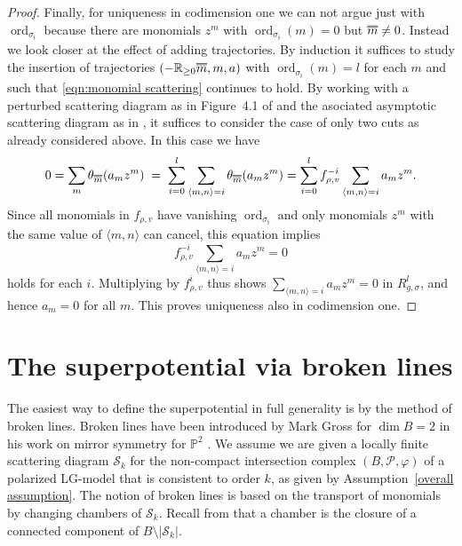 \documentclass[11pt,letter]{amsart}
\theoremstyle{definition}
\theoremstyle{remark}
\numberwithin{equation}{section}
\numberwithin{figure}{section}
\newcommand{\doublebar}[1]{\shortstack{$\overline{\hphantom{#1}}
	$\\[-4pt] $\overline{#1}$}}
\newcommand{\RR} {\mathbb{R}}
\newcommand{\PP} {\mathbb{P}}
\newcommand {\foj}  {\mathfrak{j}}
\newcommand {\ord}  {\operatorname{ord}}
\renewcommand{\P}  {\mathscr{P}}
\newcommand {\scrS}  {\mathscr{S}}
\begin{document}
\begin{proof}
Finally, for uniqueness in codimension one we can not argue just with
$\ord_{\sigma_\foj}$ because there are monomials $z^m$ with
$\ord_{\sigma_\foj}(m)=0$ but $\doublebar m\neq0$. Instead we look closer at the
effect of adding trajectories. By induction it suffices to study the insertion
of trajectories $(-\RR_{\ge 0}\doublebar m, m,a)$ with $\ord_{\sigma_\foj}
(m)=l$ for each $m$ and such that \eqref{eqn:monomial scattering} continues to
hold. By working with a perturbed scattering diagram as in Figure~4.1 of
\cite{affinecomplex} and the asociated asymptotic scattering diagram as in
\cite[\S4.3]{affinecomplex}, it suffices to consider the case of only two cuts
as already considered above. In this case we have
\[
0= \sum_m \theta_{\scriptsize\doublebar m} (a_m z^m)
\;=\;\sum_{i=0}^l \sum_{\langle m,n\rangle=i}
\theta_{\scriptsize\doublebar m} (a_m z^m)\\
=\sum_{i=0}^l  f_{\rho,v}^{-i}\sum_{\langle m,n\rangle=i} a_m z^m.
\]
Since all monomials in $f_{\rho,v}$ have vanishing $\ord_{\sigma_{\foj}}$ and
only monomials $z^m$ with the same value of $\langle m,n\rangle$ can cancel,
this equation implies
\[
f_{\rho,v}^{-i}\sum_{\langle m,n\rangle=i} a_m z^m=0
\]
holds for each $i$. Multiplying by $f_{\rho,v}^i$ thus shows $\sum_{\langle
m,n\rangle=i} a_m z^m=0$ in $R_{g,\sigma}^l$, and hence $a_m=0$ for all $m$.
This proves uniqueness also in codimension one.
\end{proof}


\section{The superpotential via broken lines}
\label{Ch: Broken lines}
The easiest way to define the superpotential in full generality is by the method
of broken lines. Broken lines have been introduced by Mark Gross for $\dim B=2$
in his work on mirror symmetry for $\PP^2$ \cite{PP2mirror}. We assume we are
given a locally finite scattering diagram $\scrS_k$ for the non-compact
intersection complex $(B,\P,\varphi)$ of a polarized LG-model that is consistent
to order $k$, as given by Assumption~\ref{overall assumption}. The notion of
broken lines is based on the transport of monomials by changing chambers of
$\scrS_k$. Recall from \cite[Def.\,2.22]{affinecomplex} that a chamber is the
closure of a connected component of $B\setminus|\scrS_k|$.
\end{document}
